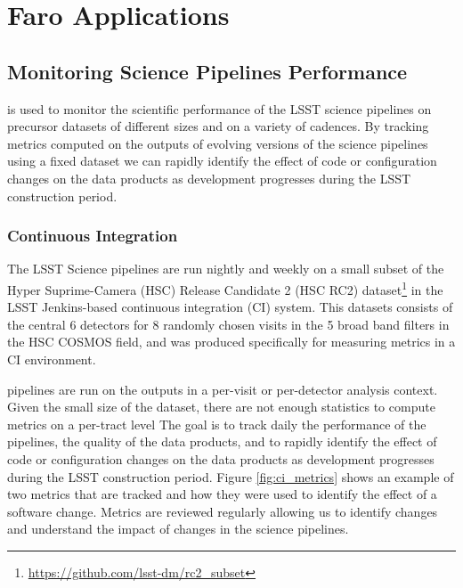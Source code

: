 \section{Faro Applications} \label{sec:applications}

\subsection{Monitoring Science Pipelines Performance} \label{ssec:monitoring}

\faro is used to monitor the scientific performance of the LSST science pipelines on precursor datasets of different sizes and on a variety of cadences\cite{dmtn-091}. 
By tracking metrics computed on the outputs of evolving versions of the science pipelines using a fixed dataset we can rapidly identify the effect of code or configuration changes on the data products as development progresses during the LSST construction period.

\subsubsection{Continuous Integration}\label{sssec:ci}

The LSST Science pipelines are run nightly and weekly on a small subset of the Hyper Suprime-Camera (HSC) Release Candidate 2 (HSC RC2) dataset\footnote{\url{https://github.com/lsst-dm/rc2_subset}} in the LSST Jenkins-based continuous integration (CI) system. 
This datasets consists of the central 6 detectors for 8 randomly chosen visits in the 5 broad band filters in the HSC COSMOS field, and was produced specifically for measuring metrics in a CI environment.

\faro pipelines are run on the outputs in a per-visit or per-detector analysis context.
Given the small size of the dataset, there are not enough statistics to compute metrics on a per-tract level 
The goal is to track daily the performance of the pipelines, the quality of the data products, and to rapidly identify the effect of code or configuration changes on the data products as development progresses during the LSST construction period.
Figure \ref{fig:ci_metrics} shows an example of two metrics that are tracked and how they were used to identify the effect of a software change.
Metrics are reviewed regularly allowing us to identify changes and understand the impact of changes in the science pipelines.

